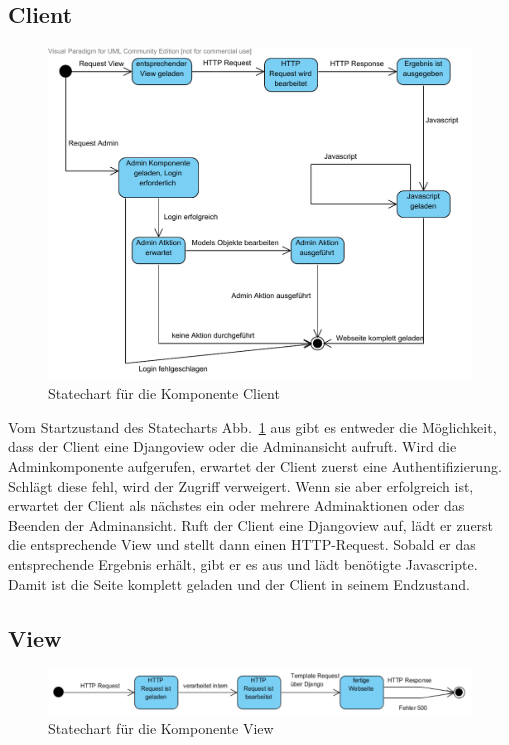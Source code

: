 \subsection{Client}
\begin{figure}
\includegraphics[width=0.8\linewidth]{bilder/KompClient.pdf}
\caption{Statechart für die Komponente Client}
\label{StClient}
\end{figure}

Vom Startzustand des Statecharts Abb.\ \ref{StClient} aus gibt es entweder die 
Möglichkeit, dass der Client eine Djangoview oder die Adminansicht aufruft. Wird 
die Adminkomponente aufgerufen, erwartet der Client zuerst eine 
Authentifizierung. Schlägt diese fehl, wird der Zugriff verweigert. Wenn sie 
aber erfolgreich ist, erwartet der Client als nächstes ein oder mehrere 
Adminaktionen oder das Beenden der Adminansicht. Ruft der Client eine Djangoview 
auf, lädt er zuerst die entsprechende View und stellt dann einen HTTP-Request. 
Sobald er das entsprechende Ergebnis erhält, gibt er es aus und lädt benötigte 
Javascripte. Damit ist die Seite komplett geladen und der Client in seinem 
Endzustand.

\subsection{View}
\begin{figure}
\includegraphics[width=0.8\linewidth]{bilder/KompView.pdf}
\caption{Statechart für die Komponente View}
\label{StView}
\end{figure}

